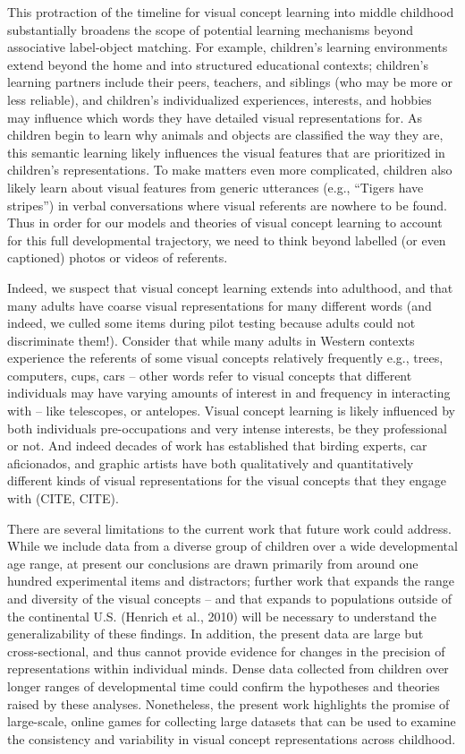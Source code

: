 \documentclass[
  man,floatsintext]{apa6}
\begin{document}
This protraction of the timeline for visual concept learning into middle childhood substantially broadens the scope of potential learning mechanisms beyond associative label-object matching. For example, children's learning environments extend beyond the home and into structured educational contexts; children's learning partners include their peers, teachers, and siblings (who may be more or less reliable), and children's individualized experiences, interests, and hobbies may influence which words they have detailed visual representations for. As children begin to learn why animals and objects are classified the way they are, this semantic learning likely influences the visual features that are prioritized in children's representations. To make matters even more complicated, children also likely learn about visual features from generic utterances (e.g., ``Tigers have stripes'') in verbal conversations where visual referents are nowhere to be found. Thus in order for our models and theories of visual concept learning to account for this full developmental trajectory, we need to think beyond labelled (or even captioned) photos or videos of referents.

Indeed, we suspect that visual concept learning extends into adulthood, and that many adults have coarse visual representations for many different words (and indeed, we culled some items during pilot testing because adults could not discriminate them!). Consider that while many adults in Western contexts experience the referents of some visual concepts relatively frequently e.g., trees, computers, cups, cars -- other words refer to visual concepts that different individuals may have varying amounts of interest in and frequency in interacting with -- like telescopes, or antelopes. Visual concept learning is likely influenced by both individuals pre-occupations and very intense interests, be they professional or not. And indeed decades of work has established that birding experts, car aficionados, and graphic artists have both qualitatively and quantitatively different kinds of visual representations for the visual concepts that they engage with (CITE, CITE).

There are several limitations to the current work that future work could address. While we include data from a diverse group of children over a wide developmental age range, at present our conclusions are drawn primarily from around one hundred experimental items and distractors; further work that expands the range and diversity of the visual concepts -- and that expands to populations outside of the continental U.S. (Henrich et al., 2010) will be necessary to understand the generalizability of these findings. In addition, the present data are large but cross-sectional, and thus cannot provide evidence for changes in the precision of representations within individual minds. Dense data collected from children over longer ranges of developmental time could confirm the hypotheses and theories raised by these analyses. Nonetheless, the present work highlights the promise of large-scale, online games for collecting large datasets that can be used to examine the consistency and variability in visual concept representations across childhood.
\end{document}
